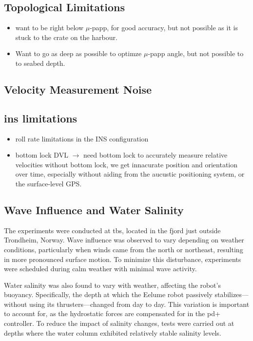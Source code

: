 \subsection*{Topological Limitations}
\begin{itemize}
    \item want to be right below \(\mu\)-papp, for good accuracy, but not
        possible as it is stuck to the crate on the harbour.
    \item Want to go as deep as possible to optimze \(\mu\)-papp angle, but
        not possible to to seabed depth.
\end{itemize}

\subsection*{Velocity Measurement Noise}

\subsection*{\gls{ins} limitations}

\begin{itemize}
    \item roll rate limitations in the INS configuration
    \item  bottom lock DVL \(\rightarrow\) need bottom lock to accurately measure relative velocities
 without bottom lock, we get innacurate position and orientation over time, especially
 without aiding from the aucustic positioning system, or the surface-level GPS.
\end{itemize}

\subsection*{Wave Influence and Water Salinity}
The experiments were conducted at \gls{tbs}, located in the fjord just outside 
Trondheim, Norway. Wave influence was observed to vary depending on weather 
conditions, particularly when winds came from the north or northeast, 
resulting in more pronounced surface motion. To minimize this disturbance, 
experiments were scheduled during calm weather with minimal wave activity.

Water salinity was also found to vary with weather, affecting the robot's 
buoyancy. Specifically, the depth at which the Eelume robot passively 
stabilizes—without using its thrusters—changed from day to day. This variation 
is important to account for, as the hydrostatic forces are compensated for in 
the \gls{pd+} controller. To reduce the impact of salinity changes, tests were 
carried out at depths where the water column exhibited relatively stable 
salinity levels.


